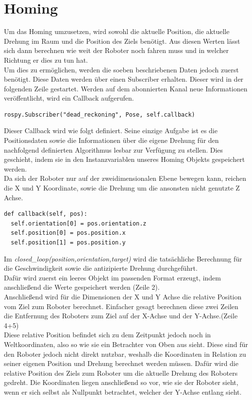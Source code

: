 \documentclass[12pt, a4paper]{report}
\begin{document}
\section{Homing}
Um das Homing umzusetzen, wird sowohl die aktuelle Position, die aktuelle Drehung im Raum und die Position des Ziels benötigt. Aus diesen Werten lässt sich dann berechnen wie weit der Roboter noch fahren muss und in welcher Richtung er dies zu tun hat.\\
Um dies zu ermöglichen, werden die soeben beschriebenen Daten jedoch zuerst benötigt. Diese Daten werden über einen Subscriber erhalten. Dieser wird in der folgenden Zeile gestartet. Werden auf dem abonnierten Kanal neue Informationen veröffentlicht, wird ein Callback aufgerufen. 
\begin{lstlisting}
rospy.Subscriber("dead_reckoning", Pose, self.callback)
\end{lstlisting}
Dieser Callback wird wie folgt definiert. Seine einzige Aufgabe ist es die Positionsdaten sowie die Informationen über die eigene Drehung für den nachfolgend definierten Algorithmus lesbar zur Verfügung zu stellen. Dies geschieht, indem sie in den Instanzvariablen unseres Homing Objekts gespeichert werden.\\
Da sich der Roboter nur auf der zweidimensionalen Ebene bewegen kann, reichen die X und Y Koordinate, sowie die Drehung um die ansonsten nicht genutzte Z Achse.
\begin{lstlisting}
def callback(self, pos):
  self.orientation[0] = pos.orientation.z
  self.position[0] = pos.position.x
  self.position[1] = pos.position.y
\end{lstlisting}
Im \textit{closed\_loop(position,orientation,target)} wird die tatsächliche Berechnung für die Geschwindigkeit sowie die antizipierte Drehung durchgeführt.\\
Dafür wird zuerst ein leeres Objekt im passenden Format erzeugt, indem anschließend die Werte gespeichert werden (Zeile 2).\\
Anschließend wird für die Dimensionen der X und Y Achse die relative Position vom Ziel zum Roboter berechnet. Einfacher gesagt berechnen diese zwei Zeilen die Entfernung des Roboters zum Ziel auf der X-Achse und der Y-Achse.(Zeile 4+5)\\
Diese relative Position befindet sich zu dem Zeitpunkt jedoch noch in Weltkoordinaten, also so wie sie ein Betrachter von Oben aus sieht. Diese sind für den Roboter jedoch nicht direkt nutzbar, weshalb die Koordinaten in Relation zu seiner eigenen Position und Drehung berechnet werden müssen. Dafür wird die relative Position des Ziels zum Roboter um die aktuelle Drehung des Roboters gedreht. Die Koordinaten liegen anschließend so vor, wie sie der Roboter sieht, wenn er sich selbst als Nullpunkt betrachtet, welcher der Y-Achse entlang sieht.\\
\end{document}
